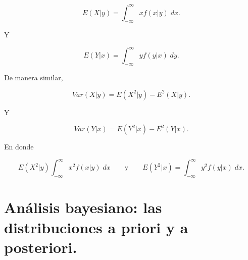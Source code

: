 \begin{tcolorbox}
    $$E(X|y)=\int_{-\infty}^\infty xf(x|y)\; dx.$$
\end{tcolorbox}

Y 

\begin{tcolorbox}
    $$E(Y|x)=\int_{-\infty}^\infty yf(y|x)\; dy.$$
\end{tcolorbox}

De manera similar,

\begin{tcolorbox}
    $$Var(X|y)=E\left(X^2|y\right)-E^2(X|y).$$
\end{tcolorbox}

Y 

\begin{tcolorbox}
    $$Var(Y|x)=E\left(Y^2|x\right)-E^2(Y|x).$$
\end{tcolorbox}

En donde 

$$E\left(X^2|y\right)\int_{-\infty}^\infty x^2 f(x|y)\; dx \qquad \mbox{y}\qquad E\left(Y^2|x\right)=\int_{-\infty}^\infty y^2f(y|x)\; dx.$$


\section{Análisis bayesiano: las distribuciones a priori y a posteriori.}
